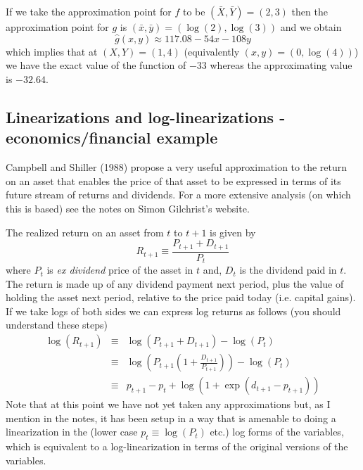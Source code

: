 \documentclass[authoryear,11pt]{elsarticle}
\begin{document}
If we take the approximation point for $f$ to be $(\bar{X},\bar{Y})=(2,3)$ then the approximation point for $g$ is $(\bar{x},\bar{y})=(\log{(2)},\log{(3)})$ and we obtain
\[
\hat{g}(x,y) \approx 117.08 -54 x - 108 y
\]
which implies that at $(X,Y)=(1,4)$ (equivalently $(x,y)=(0,\log{(4)})$) we have the exact value of the function of $-33$ whereas the approximating value is $-32.64$.

\subsection{Linearizations and log-linearizations - economics/financial example}
Campbell and Shiller (1988) propose a very useful approximation to the return on an asset that enables the price of that asset to be expressed in terms of its future stream of returns and dividends. For a more extensive analysis (on which this is based) see the notes on Simon Gilchrist's website.

The realized return on an asset from $t$ to $t+1$ is given by
\[
R_{t+1} \equiv \frac{P_{t+1} + D_{t+1}}{P_{t}}
\]
where $P_{t}$ is \emph{ex dividend} price of the asset in $t$ and, $D_{t}$ is the dividend paid in $t$. The return is made up of any dividend payment next period, plus the value of holding the asset next period, relative to the price paid today (i.e. capital gains). If we take logs of both sides we can express log returns as follows (you should understand these steps)
\begin{eqnarray}
\log{(R_{t+1})} 	&\equiv& \log{(P_{t+1} + D_{t+1})} - \log{(P_{t})}		\nonumber		\\
				&\equiv& \log{(P_{t+1}(1 + \frac{D_{t+1}}{P_{t+1}}))} - \log{(P_{t})}\nonumber \\
				&\equiv& p_{t+1} - p_{t} + \log{(1+ \exp{(d_{t+1} - p_{t+1})})} \label{eqn:log_ret}
\end{eqnarray}
Note that at this point we have not yet taken any approximations but, as I mention in the notes, it has been setup in a way that is amenable to doing a linearization in the (lower case $p_{t}\equiv\log{(P_{t})}$ etc.) log forms of the variables, which is equivalent to a log-linearization in terms of the original versions of the variables.
\end{document}
